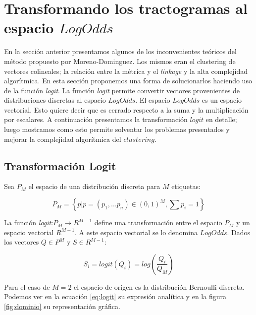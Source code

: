 \section{Transformando los tractogramas al espacio $LogOdds$}

En la secci\'on anterior presentamos algunos de los inconvenientes 
te\'oricos del m\'etodo propuesto por Moreno-Dominguez. Los mismos eran el
clustering de vectores colineales; la relaci\'on entre la m\'etrica y el
\textit{linkage} y la alta complejidad algor\'itmica. En esta secci\'on
proponemos una forma de solucionarlos haciendo uso de la funci\'on 
\textit{logit}. La funci\'on \textit{logit} permite convertir vectores
provenientes de distribuciones discretas al espacio $LogOdds$. El 
espacio $LogOdds$ es un espacio vectorial. Esto quiere decir que es 
cerrado respecto a la suma y la multiplicaci\'on por escalares. A 
continuaci\'on presentamos la transformaci\'on $logit$ en detalle; luego
mostramos como esto permite solventar los problemas presentados y mejorar 
la complejidad algor\'itmica del $clustering$. \\

\subsection{Transformaci\'on Logit}
\label{sec:logit}

Sea $P_M$ el espacio de una distribuci\'on discreta para $M$ etiquetas: 

$$P_M = \left\{  p | p = (p_1,\dots p_n) \in (0,1)^M , \sum{p_i} = 1 \right\}$$

La funci\'on \textit{logit}:$P_M \rightarrow R^{M-1}$ define una
transformaci\'on entre el espacio $P_M$ y un espacio vectorial $R^{M-1}$.
A este espacio vectorial se lo denomina $LogOdds$. Dados los vectores 
$Q \in P^M$ y $S \in R^{M-1}$:

$$S_i = logit(Q_i) = log\left(\frac{Q_i}{Q_M}\right)$$

Para el caso de $M=2$ el espacio de origen es la distribuci\'on Bernoulli
discreta. Podemos ver en la ecuaci\'on \ref{eq:logit} su expresi\'on 
anal\'itica y en la figura \ref{fig:dominio} su representaci\'on gr\'afica.

